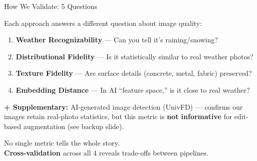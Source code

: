 \documentclass[aspectratio=169, 11pt]{beamer}
\begin{document}
\begin{frame}{How We Validate: 5 Questions}

{\small Each approach answers a different question about image quality:}

\vspace{0.5em}
\begin{enumerate}\setlength\itemsep{0.3em}
    \item \textbf{Weather Recognizability} --- Can you tell it's raining/snowing?
    \item \textbf{Distributional Fidelity} --- Is it statistically similar to real weather photos?
    \item \textbf{Texture Fidelity} --- Are surface details (concrete, metal, fabric) preserved?
    \item \textbf{Embedding Distance} --- In AI ``feature space,'' is it close to real weather?
\end{enumerate}

\vspace{0.3em}
{\small \textbf{+ Supplementary:} AI-generated image detection (UnivFD) --- confirms our images retain real-photo statistics, but this metric is \textbf{not informative} for edit-based augmentation (see backup slide).}

\vspace{0.3em}
No single metric tells the whole story.\\
\textbf{Cross-validation} across all 4 reveals trade-offs between pipelines.
\end{frame}
\end{document}
